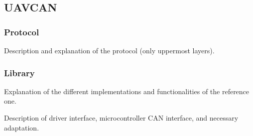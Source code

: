 \subsection{UAVCAN}



\subsubsection{Protocol}
Description and explanation of the protocol (only uppermost layers).

\subsubsection{Library}
Explanation of the different implementations and functionalities of the reference one.

Description of driver interface, microcontroller CAN interface, and necessary adaptation.

